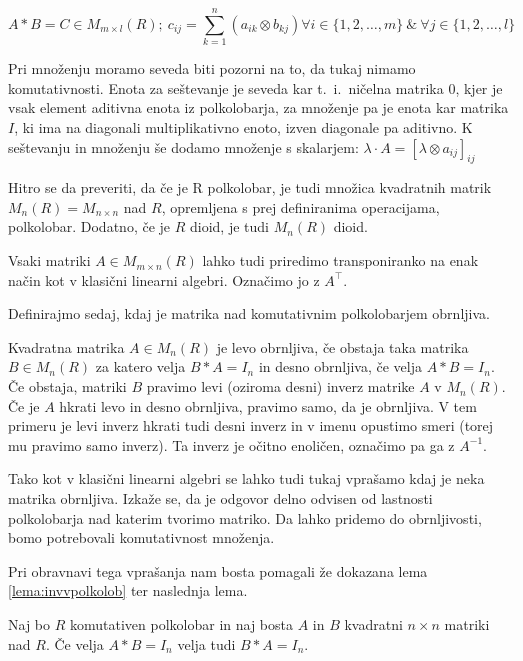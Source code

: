 \documentclass[mat1]{fmfdelo}
\begin{document}
$$ 
	A*B = C \in M_{m\times l}(R);~ c_{ij} = \sum_{k = 1}^{n}(a_{ik}\otimes b_{kj}) \forall i \in \{1, 2, \ldots, m\}~\&~\forall j \in \{1, 2, \ldots, l\}
$$

Pri množenju moramo seveda biti pozorni na to, da tukaj nimamo komutativnosti. Enota za seštevanje je seveda kar t.~i.~ničelna matrika $0$, kjer je vsak element aditivna enota iz polkolobarja, za množenje pa je enota kar matrika $I$, ki ima na diagonali multiplikativno enoto, izven diagonale pa aditivno. K seštevanju in množenju še dodamo množenje s skalarjem: $\lambda \cdot A = [\lambda \otimes a_{ij}]_{ij}$

Hitro se da preveriti, da če je R polkolobar, je tudi množica kvadratnih matrik $M_n(R) = M_{n\times n}$ nad $R$, opremljena s prej definiranima operacijama, polkolobar. Dodatno, če je $R$ dioid, je tudi $M_n(R)$ dioid.

Vsaki matriki $A\in M_{m\times n}(R)$ lahko tudi priredimo transponiranko na enak način kot v klasični linearni algebri. Označimo jo z $A^{\top}$.

Definirajmo sedaj, kdaj je matrika nad komutativnim polkolobarjem obrnljiva.

\begin{definicija}\label{def:invmatr}
	Kvadratna matrika $A\in M_n(R)$ je levo obrnljiva, če obstaja taka matrika $B\in M_n(R)$ za katero velja $B*A = I_n$ in desno obrnljiva, če velja $A*B = I_n$. Če obstaja, matriki $B$ pravimo levi (oziroma desni) inverz matrike $A$ v $M_n(R)$. Če je $A$ hkrati levo in desno obrnljiva, pravimo samo, da je obrnljiva. V tem primeru je levi inverz hkrati tudi desni inverz in v imenu opustimo smeri (torej mu pravimo samo inverz). Ta inverz je očitno enoličen, označimo pa ga z $A^{-1}$.
\end{definicija}

Tako kot v klasični linearni algebri se lahko tudi tukaj vprašamo kdaj je neka matrika obrnljiva. Izkaže se, da je odgovor delno odvisen od lastnosti polkolobarja nad katerim tvorimo matriko. Da lahko pridemo do obrnljivosti, bomo potrebovali komutativnost množenja.

Pri obravnavi tega vprašanja nam bosta pomagali že dokazana lema \ref{lema:invvpolkolob} ter naslednja lema.

\begin{izrek}\label{izr:ABIBAI}
	Naj bo $R$ komutativen polkolobar in naj bosta $A$ in $B$ kvadratni $n\times n$ matriki nad $R$. Če velja $A*B = I_n$ velja tudi $B*A=I_n$.
\end{izrek}
\end{document}
